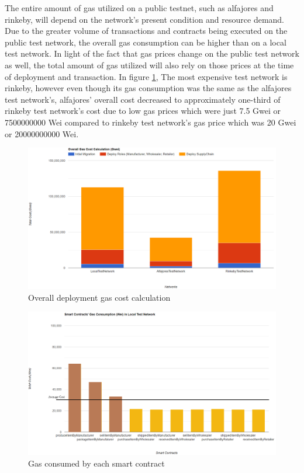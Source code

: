 The entire amount of gas utilized on a public testnet, such as alfajores and rinkeby, will depend on the network's present condition and resource demand. Due to the greater volume of transactions and contracts being executed on the public test network, the overall gas consumption can be higher than on a local test network. In light of the fact that gas prices change on the public test network as well, the total amount of gas utilized will also rely on those prices at the time of deployment and transaction. In figure \ref{Overall Gas Cost calculation}, The most expensive test network is rinkeby, however even though its gas consumption was the same as the alfajores test network's, alfajores' overall cost decreased to approximately one-third of rinkeby test network's cost due to low gas prices which were just 7.5 Gwei or 7500000000 Wei compared to rinkeby test network's gas price which was 20 Gwei or 20000000000 Wei.

\begin{figure}[h!]
\centering
  \includegraphics[width=12cm]{includes/figures/totalCost.png} 
  \caption{Overall deployment gas cost calculation }
  \label{Overall Gas Cost calculation}
\end{figure}

\vspace{.5cm}

\begin{figure}[!h]
\centering
  \includegraphics[width=12cm]{includes/figures/smartcontractgas.png} 
  \caption{Gas consumed by each smart contract}
  \label{Gas consumed by each contract}
\end{figure}

